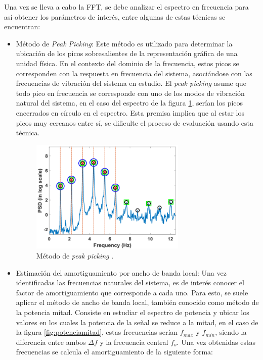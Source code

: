 Una vez se lleva a cabo la FFT, se debe analizar el espectro en frecuencia para así obtener los parámetros de interés, entre algunas de estas técnicas se encuentran:

\begin{itemize}
    \item Método de \textit{Peak Picking}: Este método es utilizado para determinar la ubicación de los picos sobresalientes de la representación gráfica de una unidad física. En el contexto del dominio de la frecuencia, estos picos se corresponden con la respuesta en frecuencia del sistema, asociándose con las frecuencias de vibración del sistema en estudio. El \textit{peak picking} asume que todo pico en frecuencia se corresponde con uno de los modos de vibración natural del sistema, en el caso del espectro de la figura \ref{fig:peakpicking}, serían los picos encerrados en círculo en el espectro. Esta premisa implica que al estar los picos muy cercanos entre sí, se dificulte el proceso de evaluación usando esta técnica.
    
    \begin{figure}[H]
        \centering
        \includegraphics[width = 0.7\textwidth]{imagenes/cap1_marcoteo/peakpicking.png}
        \caption{Método de \textit{peak picking} \citep{peakpicking2021}.}
        \label{fig:peakpicking}
    \end{figure}
    
    \item Estimación del amortiguamiento por ancho de banda local: Una vez identificadas las frecuencias naturales del sistema, es de interés conocer el factor de amortiguamiento que corresponde a cada uno. Para esto, se suele aplicar el método de ancho de banda local, también conocido como método de la potencia mitad. Consiste en estudiar el espectro de potencia y ubicar los valores en los cuales la potencia de la señal se reduce a la mitad, en el caso de la figura \ref{fig:potenciamitad}, estas frecuencias serían $f_{max}$ y $f_{min}$, siendo la diferencia entre ambos $\Delta f$ y la frecuencia central $f_o$. Una vez obtenidas estas frecuencias se calcula el amortiguamiento de la siguiente forma:
    

\end{itemize}
